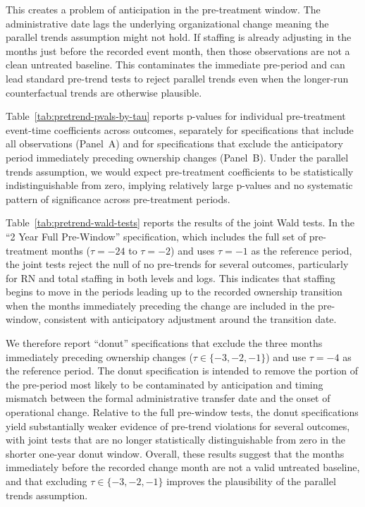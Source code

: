 \documentclass[12pt]{article}
\begin{document}
This creates a problem of anticipation in the pre-treatment window. The administrative date lags the underlying organizational change meaning the parallel trends assumption might not hold. If staffing is already adjusting in the months just before the recorded event month, then those observations are not a clean untreated baseline. This contaminates the immediate pre-period and can lead standard pre-trend tests to reject parallel trends even when the longer-run counterfactual trends are otherwise plausible.

Table~\ref{tab:pretrend-pvals-by-tau} reports p-values for individual pre-treatment event-time coefficients across outcomes, separately for specifications that include all observations (Panel~A) and for specifications that exclude the anticipatory period immediately preceding ownership changes (Panel~B). Under the parallel trends assumption, we would expect pre-treatment coefficients to be statistically indistinguishable from zero, implying relatively large p-values and no systematic pattern of significance across pre-treatment periods.


\FloatBarrier

Table~\ref{tab:pretrend-wald-tests} reports the results of the joint Wald tests. In the ``2 Year Full Pre-Window'' specification, which includes the full set of pre-treatment months ($\tau=-24$ to $\tau=-2$) and uses $\tau=-1$ as the reference period, the joint tests reject the null of no pre-trends for several outcomes, particularly for RN and total staffing in both levels and logs. This indicates that staffing begins to move in the periods leading up to the recorded ownership transition when the months immediately preceding the change are included in the pre-window, consistent with anticipatory adjustment around the transition date.

We therefore report ``donut'' specifications that exclude the three months immediately preceding ownership changes ($\tau\in\{-3,-2,-1\}$) and use $\tau=-4$ as the reference period. The donut specification is intended to remove the portion of the pre-period most likely to be contaminated by anticipation and timing mismatch between the formal administrative transfer date and the onset of operational change. Relative to the full pre-window tests, the donut specifications yield substantially weaker evidence of pre-trend violations for several outcomes, with joint tests that are no longer statistically distinguishable from zero in the shorter one-year donut window. Overall, these results suggest that the months immediately before the recorded change month are not a valid untreated baseline, and that excluding $\tau\in\{-3,-2,-1\}$ improves the plausibility of the parallel trends assumption.
\end{document}

